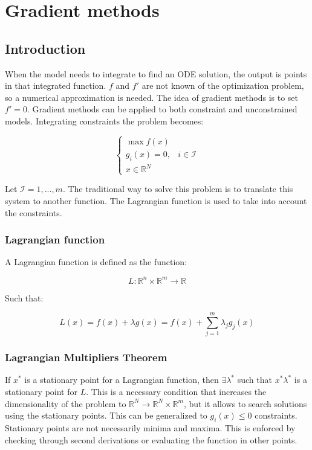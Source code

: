 \graphicspath{{chapters/09/images}}
\chapter{Gradient methods}

\section{Introduction}
When the model needs to integrate to find an ODE solution, the output is points in that integrated function.
$f$ and $f'$ are not known of the optimization problem, so a numerical approximation is needed.
The idea of gradient methods is to set $f'=0$.
Gradient methods can be applied to both constraint and unconstrained models.
Integrating constraints the problem becomes:

$$\begin{cases}\max f(x) &  \\ g_i(x)=0, & i \in \mathcal{I} \\ x \in \mathbb{R}^N &\end{cases}$$

Let $\mathcal{I}= 1,...,m$.
The traditional way to solve this problem is to translate this system to another function.
The Lagrangian function is used to take into account the constraints.

  \subsection{Lagrangian function}
  A Lagrangian function is defined as the function:

  $$L: \mathbb{R}^n \times \mathbb{R}^m \rightarrow \mathbb{R}$$

  Such that:

  $$L(x)= f(x) + \lambda g(x) = f(x) + \sum_{j=1}^m \lambda_j g_j(x)$$

  \subsection{Lagrangian Multipliers Theorem}
  If $x^*$ is a stationary point for a Lagrangian function, then $\exists \lambda^*$ such that $x^* \lambda^*$ is a stationary point for $L$.
  This is a necessary condition that increases the dimensionality of the problem to $\mathbb{R}^N \rightarrow \mathbb{R}^N \times \mathbb{R}^m$, but it allows to search solutions using the stationary points.
  This can be generalized to $g_i(x)\leq 0$ constraints.
  Stationary points are not necessarily minima and maxima.
  This is enforced by checking through second derivations or evaluating the function in other points.

